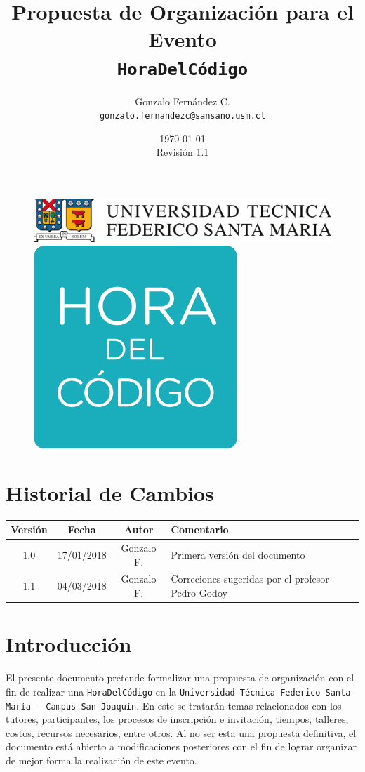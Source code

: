 \documentclass[letterpaper,12pt]{article}
\title{Propuesta de Organización para el Evento \\ \texttt{\textbf{HoraDelCódigo}} }
\author{Gonzalo Fernández C. \\ \texttt{gonzalo.fernandezc@sansano.usm.cl} }
\date{\today\\Revisión 1.1}
\begin{document}
\begin{titlepage}

\begin{figure}
\includegraphics[width=0.4\linewidth]{logou} 
\hspace{\fill}
\includegraphics[width=0.08\linewidth]{logo} 
\end{figure}

\maketitle

\end{titlepage}


\section{Historial de Cambios}

\begin{center}
\begin{tabular}{|c|c|c|l|}
\hline
Versión & Fecha & Autor & Comentario \\
\hline \hline
1.0 & 17/01/2018 & Gonzalo F. & Primera versión del documento \\ \hline
1.1 & 04/03/2018 & Gonzalo F. & Correciones sugeridas por el profesor Pedro Godoy \\ \hline
\end{tabular}
\end{center}

\section{Introducción}

El presente documento pretende formalizar una propuesta de organización con el fin de realizar una \texttt{HoraDelCódigo} en la \texttt{Universidad Técnica Federico Santa María - Campus San Joaquín}. En este se tratarán temas relacionados con los tutores, participantes, los procesos de inscripción e invitación, tiempos, talleres, costos, recursos necesarios, entre otros. Al no ser esta una propuesta definitiva, el documento está abierto a modificaciones posteriores con el fin de lograr organizar de mejor forma la realización de este evento.\\
\end{document}
